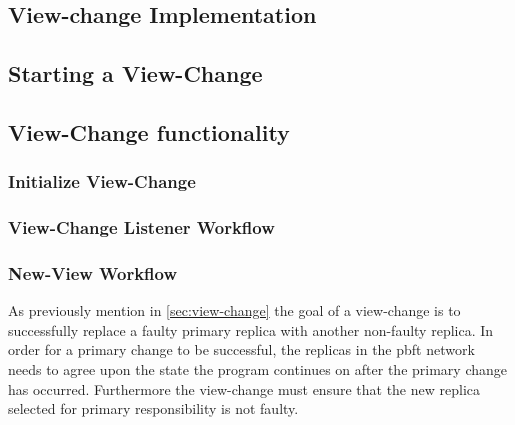 \iffalse
\subsection{View-change Implementation}
\subsection{Starting a View-Change}
\subsection{View-Change functionality}
\subsubsection{Initialize View-Change}
\subsubsection{View-Change Listener Workflow}
\subsubsection{New-View Workflow}

As previously mention in \autoref{sec:view-change} the goal of a view-change is to successfully replace a faulty primary replica with another non-faulty replica. In order for a primary change to be successful, the replicas in the \ac{pbft} network needs to agree upon the state the program continues on after the primary change has occurred. Furthermore the view-change must ensure that the new replica selected for primary responsibility is not faulty. 

